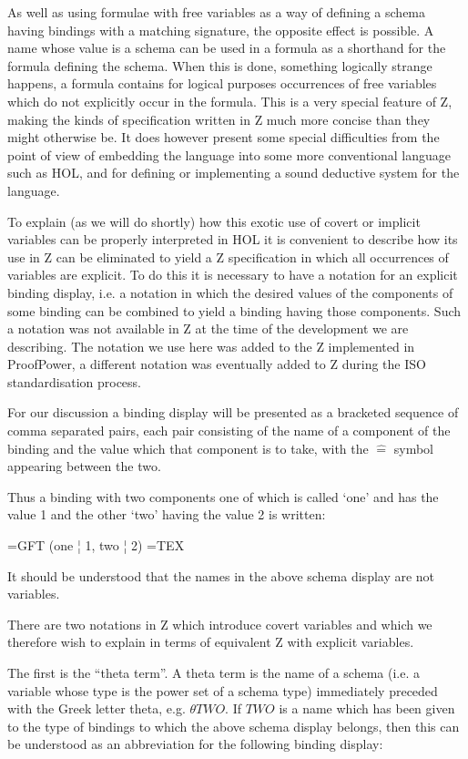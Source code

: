 \documentclass[10pt,titlepage]{book}
\begin{document}
As well as using formulae with free variables as a way of defining a schema having bindings with a matching signature, the opposite effect is possible.
A name whose value is a schema can be used in a formula as a shorthand for the formula defining the schema.
When this is done, something logically strange happens, a formula contains for logical purposes occurrences of free variables which do not explicitly occur in the formula.
This is a very special feature of Z, making the kinds of specification written in Z much more concise than they might otherwise be.
It does however present some special difficulties from the point of view of embedding the language into some more conventional language such as HOL, and for defining or implementing a sound deductive system for the language.

To explain (as we will do shortly) how this exotic use of covert or implicit variables can be properly interpreted in HOL it is convenient to describe how its use in Z can be eliminated to yield a Z specification in which all occurrences of variables are explicit.
To do this it is necessary to have a notation for an explicit binding display, i.e. a notation in which the desired values of the components of some binding can be combined to yield a binding having those components.
Such a notation was not available in Z at the time of the development we are describing.
The notation we use here was added to the Z implemented in ProofPower, a different notation was eventually added to Z during the ISO standardisation process.

For our discussion a binding display will be presented as a bracketed sequence of comma separated pairs, each pair consisting of the name of a component of the binding and the value which that component is to take, with the $\widehat=$ symbol appearing between the two.

Thus a binding with two components one of which is called `one' and has the value 1 and the other `two' having the value 2 is written:

=GFT
(one ¦ 1, two ¦ 2)
=TEX


It should be understood that the names in the above schema display are not variables.

There are two notations in Z which introduce covert variables and which we therefore wish to explain in terms of equivalent Z with explicit variables.

The first is the ``theta term''.
A theta term is the name of a schema (i.e. a variable whose type is the power set of a schema type) immediately preceded with the Greek letter theta, e.g. ${\theta}TWO$.
If $TWO$ is a name which has been given to the type of bindings to which the above schema display belongs, then this can be understood as an abbreviation for the following binding display:
\end{document}
